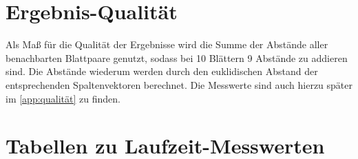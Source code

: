 \documentclass[a4paper, 10pt, twoside, onecolumn, parskip]{scrartcl}
\begin{document}
    \section{Ergebnis-Qualität} \label{sec:qualität}

    Als Maß für die Qualität der Ergebnisse wird die Summe der Abstände aller benachbarten Blattpaare genutzt, sodass bei 10 Blättern 9 Abstände zu addieren sind.
    Die Abstände wiederum werden durch den euklidischen Abstand der entsprechenden Spaltenvektoren berechnet.
    Die Messwerte sind auch hierzu später im \autoref{app:qualität} zu finden.

    \newpage
    \appendix

    \section{Tabellen zu Laufzeit-Messwerten} \label{app:laufzeiten}
\end{document}
